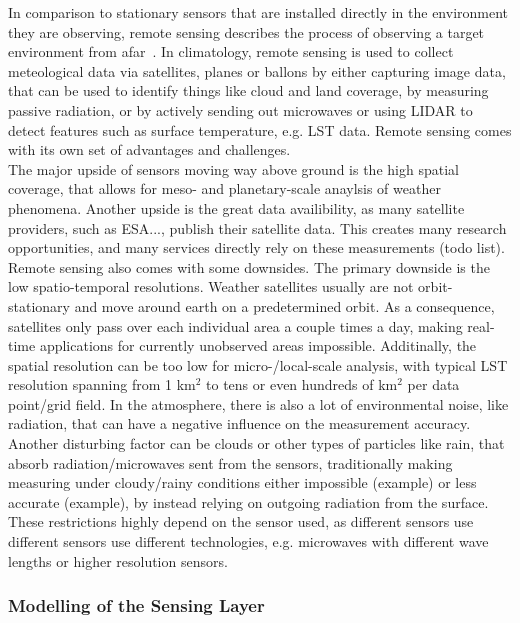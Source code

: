 In comparison to stationary sensors that are installed directly in the environment they are observing, remote sensing describes the process of observing a target environment from afar~\cite{campbell2011introduction}. In climatology, remote sensing is used to collect meteological data via satellites, planes or ballons by either capturing image data, that can be used to identify things like cloud and land coverage, by measuring passive radiation, or by actively sending out microwaves or using LIDAR to detect features such as surface temperature, e.g. LST data. Remote sensing comes with its own set of advantages and challenges.\\
The major upside of sensors moving way above ground is the high spatial coverage, that allows for meso- and planetary-scale anaylsis of weather phenomena. Another upside is the great data availibility, as many satellite providers, such as ESA..., publish their satellite data. This creates many research opportunities, and many services directly rely on these measurements (todo list).\\ %
Remote sensing also comes with some downsides. The primary downside is the low spatio-temporal resolutions. Weather satellites usually are not orbit-stationary and move around earth on a predetermined orbit. As a consequence, satellites only pass over each individual area a couple times a day, making real-time applications for currently unobserved areas impossible. Additinally, the spatial resolution can be too low for micro-/local-scale analysis, with typical LST resolution spanning from 1 km$^{2}$ to tens or even hundreds of km$^{2}$ per data point/grid field. In the atmosphere, there is also a lot of environmental noise, like radiation, that can have a negative influence on the measurement accuracy. Another disturbing factor can be clouds or other types of particles like rain, that absorb radiation/microwaves sent from the sensors, traditionally making measuring under cloudy/rainy conditions either impossible (example) or less accurate (example), by instead relying on outgoing radiation from the surface. These restrictions highly depend on the sensor used, as different sensors use different 
sensors use different technologies, e.g. microwaves with different wave lengths or higher resolution sensors.


\subsubsection{Modelling of the Sensing Layer}

